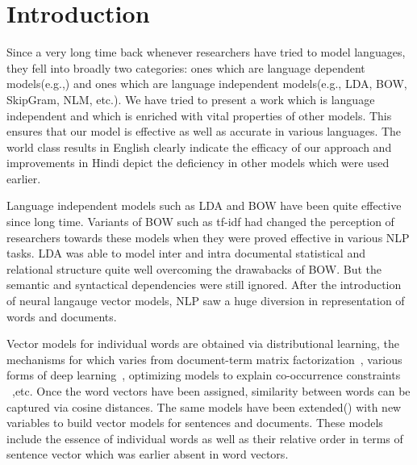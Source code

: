 \chapter{Introduction}
Since a very long time back whenever researchers have tried to model languages, they fell into broadly two categories: ones which are language dependent models(e.g.,\cite{Socher:13}) and ones which are language independent models(e.g., LDA, BOW, SkipGram, NLM, etc.). We have tried to present a work which is language independent and which is enriched with vital properties of other models. This ensures that our model is effective as well as accurate in various languages. The world class results in English clearly indicate the efficacy of our approach and improvements in Hindi depict the deficiency in other models which were used earlier.

Language independent models such as LDA  and BOW have been quite effective since long time. Variants of BOW such as tf-idf had changed the perception of researchers towards these models when they were proved effective in various NLP tasks. LDA was able to model inter and intra documental statistical and relational structure quite well overcoming the drawabacks of BOW. But the semantic and syntactical dependencies were still ignored. After the introduction of neural langauge vector models,  NLP saw a huge diversion in representation of words and documents.

Vector models for individual words are obtained via distributional learning, the mechanisms for which varies from document-term matrix factorization~\cite{Landauer:97}, various forms of deep learning~\cite{Collobert:08,Turian:10,Socher:13}, optimizing models to explain co-occurrence constraints ~\cite{Mikolov:13a,Pennington:14},etc. Once the word vectors have been assigned, similarity between words can be captured via cosine distances. The same models have been extended(\cite{Le:14}) with new variables to build vector models for sentences and documents. These models include the essence of individual words as well as their relative order in terms of sentence vector which was earlier absent in word vectors.

